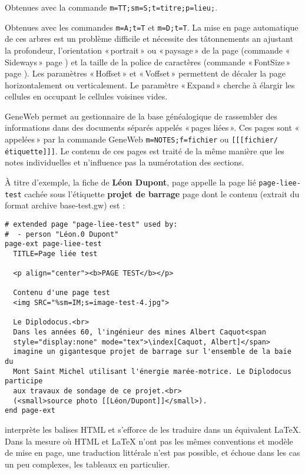 \begin{description}[style=nextline]
\item[Liste par titre] Obtenues avec la commande
\verb|m=TT;sm=S;t=titre;p=lieu;|.

\item[Arbres] Obtenues avec les commandes \verb|m=A;t=T| et \verb|m=D;t=T|.
La mise en page automatique de ces arbres est un problème difficile et
nécessite des tâtonnements an ajustant la profondeur, l'orientation «\,portrait\,»
ou «\,paysage\,» de la page (commande «\,Sideways\,» page \pageref{sideways}) et la
taille de la police de caractères (commande «\,FontSize\,» page \pageref{fontsize}).
Les paramètres «\,Hoffset\,» et «\,Voffset\,» permettent de décaler la page
horizontalement ou verticalement. Le paramètre «\,Expand\,» cherche à élargir
les cellules en occupant le cellules voisines vides.

\item[Pages liées] GeneWeb permet au gestionnaire de la base généalogique
de rassembler des informations dans des documents séparés appelés «\,pages liées\,».
Ces pages sont «\,appelées\,» par la commande GeneWeb \verb|m=NOTES;f=fichier| ou
\verb|[[[fichier/étiquette]]]|. Le contenu de ces pages est traité de la même
manière que les notes individuelles et n'influence pas la numérotation
des sections.

À titre d'exemple, la fiche de
{\bf Léon Dupont}, page \pageref{leondupont} appelle la page lié
\verb|page-liee-test| cachée sous l'étiquette {\bf projet de barrage}
page \pageref{pageliee} dont le contenu (extrait du format archive
base-test.gw) est :

\begin{verbatim}
# extended page "page-liee-test" used by:
#  - person "Léon.0 Dupont"
page-ext page-liee-test
  TITLE=Page liée test
  
  <p align="center"><b>PAGE TEST</b></p>
  
  Contenu d'une page test
  <img SRC="%sm=IM;s=image-test-4.jpg">
  
  Le Diplodocus.<br>
  Dans les années 60, l'ingénieur des mines Albert Caquot<span
  style="display:none" mode="tex">\index[Caquot, Albert]</span>
  imagine un gigantesque projet de barrage sur l'ensemble de la baie du
  Mont Saint Michel utilisant l'énergie marée-motrice. Le Diplodocus participe
  aux travaux de sondage de ce projet.<br>
  (<small>source photo [[Léon/Dupont]]</small>).
end page-ext
\end{verbatim}

\item[Autres pages] \gwtol{} interprète les balises HTML et s'efforce de
les traduire dans un équivalent \LaTeX{}. Dans la mesure où HTML et \LaTeX{}
n'ont pas les mêmes conventions et modèle de mise en page, une traduction
littérale n'est pas possible, et échoue dans les cas un peu complexes,
les tableaux en particulier.

\end{description}

